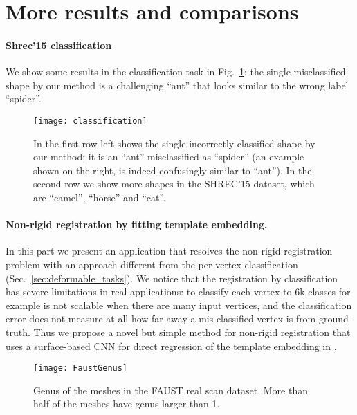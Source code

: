 \documentclass[10pt,twocolumn,letterpaper]{article}
\begin{document}
\section{More results and comparisons}
\label{appn:additional_comparison}

\paragraph{Shrec'15 classification}
We show some results in the classification task in Fig.~\ref{fig:classification_result}; the single misclassified shape by our method is a challenging ``ant'' that looks similar to the wrong label ``spider''.

\begin{figure}
	\centering
	\texttt{[image: classification]}
	\vspace{-2mm}
	\caption{In the first row left shows the single incorrectly classified shape by our method; it is an ``ant'' misclassified as ``spider'' (an example shown on the right, is indeed confusingly similar to ``ant''). In the second row we show more shapes in the SHREC'15 dataset, which are ``camel'', ``horse'' and ``cat''. }
	\label{fig:classification_result}
	\vspace{-2mm}
\end{figure}


\paragraph{Non-rigid registration by fitting template embedding.}
In this part we present an application that resolves the non-rigid registration problem with an approach different from the per-vertex classification (Sec.~\ref{sec:deformable_tasks}).
We notice that the registration by classification has severe limitations in real applications: to classify each vertex to 6k classes for example is not scalable when there are many input vertices, and the classification error does not measure at all how far away a mis-classified vertex is from ground-truth.
Thus we propose a novel but simple method for non-rigid registration that uses a surface-based CNN for direct regression of the template embedding in .

\begin{figure}[t]
	\centering
	\texttt{[image: FaustGenus]}
	\caption{Genus of the meshes in the FAUST real scan dataset. More than half of the meshes have genus larger than 1.}
	\label{fig:faust_genus}
	\vspace{-2mm}
\end{figure}
\end{document}
